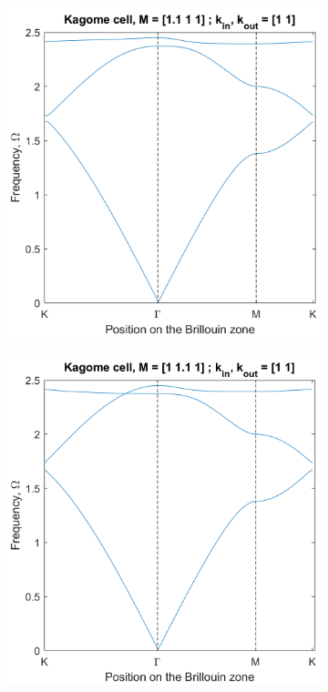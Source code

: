 \begin{figure}[!h]
\begin{subfigure}[b]{.33\textwidth}
  \centering
  \includegraphics[width=1\linewidth]{imgs/kagomebs1.png}
\end{subfigure}%
\begin{subfigure}[b]{.33\textwidth}
  \centering
  \includegraphics[width=1\linewidth]{imgs/kagomebs2.png}

\end{subfigure}
\end{figure}
